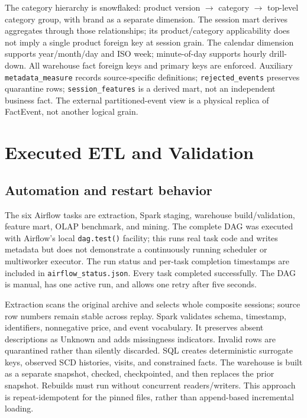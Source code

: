 \documentclass[conference]{IEEEtran}
\newcommand{\code}[1]{\texttt{\small #1}}
\begin{document}
\begin{table}[t]\centering\caption{Warehouse bus matrix (X: applicable; --: not applicable)}\label{tab:bus}\scriptsize
{}\end{table}
The category hierarchy is snowflaked: product version $\rightarrow$ category $\rightarrow$ top-level category group, with brand as a separate dimension. The session mart derives aggregates through those relationships; its product/category applicability does not imply a single product foreign key at session grain. The calendar dimension supports year/month/day and ISO week; minute-of-day supports hourly drill-down. All warehouse fact foreign keys and primary keys are enforced. Auxiliary \code{metadata\_measure} records source-specific definitions; \code{rejected\_events} preserves quarantine rows; \code{session\_features} is a derived mart, not an independent business fact. The external partitioned-event view is a physical replica of FactEvent, not another logical grain.

\section{Executed ETL and Validation}
\subsection{Automation and restart behavior}
The six Airflow tasks are extraction, Spark staging, warehouse build/validation, feature mart, OLAP benchmark, and mining. The complete DAG was executed with Airflow's local \code{dag.test()} facility; this runs real task code and writes metadata but does not demonstrate a continuously running scheduler or multiworker executor. The run status and per-task completion timestamps are included in \code{airflow\_status.json}. Every task completed successfully. The DAG is manual, has one active run, and allows one retry after five seconds.

Extraction scans the original archive and selects whole composite sessions; source row numbers remain stable across replay. Spark validates schema, timestamp, identifiers, nonnegative price, and event vocabulary. It preserves absent descriptions as Unknown and adds missingness indicators. Invalid rows are quarantined rather than silently discarded. SQL creates deterministic surrogate keys, observed SCD histories, visits, and constrained facts. The warehouse is built as a separate snapshot, checked, checkpointed, and then replaces the prior snapshot. Rebuilds must run without concurrent readers/writers. This approach is repeat-idempotent for the pinned files, rather than append-based incremental loading.
\end{document}
